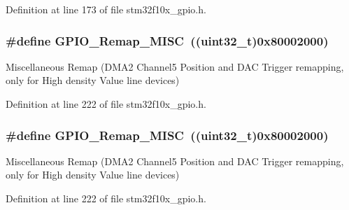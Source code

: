 Definition at line 173 of file stm32f10x\+\_\+gpio.\+h.

\subsubsection[{\texorpdfstring{G\+P\+I\+O\+\_\+\+Remap\+\_\+\+M\+I\+SC}{GPIO_Remap_MISC}}]{\setlength{\rightskip}{0pt plus 5cm}\#define G\+P\+I\+O\+\_\+\+Remap\+\_\+\+M\+I\+SC~(({\bf uint32\+\_\+t})0x80002000)}\hypertarget{group___g_p_i_o___remap__define_ga543f3626303b3452528cb622ad088d26}{}\label{group___g_p_i_o___remap__define_ga543f3626303b3452528cb622ad088d26}
Miscellaneous Remap (D\+M\+A2 Channel5 Position and D\+AC Trigger remapping, only for High density Value line devices) 

Definition at line 222 of file stm32f10x\+\_\+gpio.\+h.

\subsubsection[{\texorpdfstring{G\+P\+I\+O\+\_\+\+Remap\+\_\+\+M\+I\+SC}{GPIO_Remap_MISC}}]{\setlength{\rightskip}{0pt plus 5cm}\#define G\+P\+I\+O\+\_\+\+Remap\+\_\+\+M\+I\+SC~(({\bf uint32\+\_\+t})0x80002000)}\hypertarget{group___g_p_i_o___remap__define_ga543f3626303b3452528cb622ad088d26}{}\label{group___g_p_i_o___remap__define_ga543f3626303b3452528cb622ad088d26}
Miscellaneous Remap (D\+M\+A2 Channel5 Position and D\+AC Trigger remapping, only for High density Value line devices) 

Definition at line 222 of file stm32f10x\+\_\+gpio.\+h.

